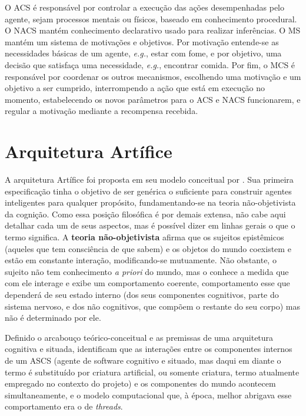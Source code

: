 O ACS é responsável por controlar a execução das ações desempenhadas pelo agente, sejam processos mentais ou físicos, baseado em conhecimento procedural. O NACS mantém conhecimento declarativo usado para realizar inferências. O MS mantém um sistema de motivações e objetivos. Por motivação entende-se as necessidades básicas de um agente, \textit{e.g.}, estar com fome, e por objetivo, uma decisão que satisfaça uma necessidade, \textit{e.g.},  encontrar comida. Por fim, o MCS é responsável por coordenar os outros mecanismos, escolhendo uma motivação e um objetivo a ser cumprido, interrompendo a ação que está em execução no momento, estabelecendo os novos parâmetros para o ACS e NACS funcionarem, e regular a motivação mediante a recompensa recebida.


\section{Arquitetura Artífice}
\label{sec:artifice}

A arquitetura Artífice foi proposta em seu modelo conceitual por . Sua primeira especificação tinha o objetivo de ser genérica o suficiente para construir agentes inteligentes para qualquer propósito, fundamentando-se na teoria não-objetivista da cognição. Como essa posição filosófica é por demais extensa, não cabe aqui detalhar cada um de seus aspectos, mas é possível dizer em linhas gerais o que o termo significa. A \textbf{teoria não-objetivista} afirma que os sujeitos epistêmicos (aqueles que tem consciência de que sabem) e os objetos do mundo coexistem e estão em constante interação, modificando-se mutuamente. Não obstante, o sujeito não tem conhecimento \textit{a priori} do mundo, mas o conhece a medida que com ele  interage e exibe um comportamento coerente, comportamento esse que dependerá de seu estado interno (dos seus componentes cognitivos, parte do sistema nervoso, e dos não cognitivos, que compõem o restante do seu corpo) mas não é determinado por ele. 

Definido o arcabouço teórico-conceitual e as premissas de uma arquitetura cognitiva e situada,  identificam que as interações entre os componentes internos de um ASCS (agente de software cognitivo e situado, mas daqui em diante o termo é substituído por criatura artificial, ou somente criatura, termo atualmente empregado no contexto do projeto) e os componentes do mundo acontecem simultaneamente, e o modelo computacional que, à época, melhor abrigava esse comportamento era o de \textit{threads}.

